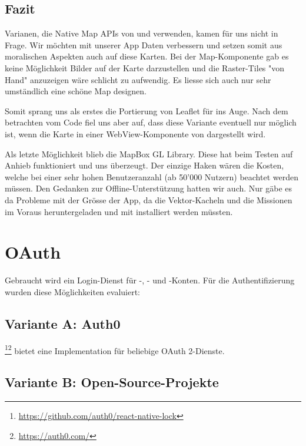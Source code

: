 \subsection{Fazit}

Varianen, die Native Map APIs von  und  verwenden, kamen für uns nicht in Frage.
Wir möchten mit unserer App  Daten verbessern und setzen somit aus moralischen Aspekten auch auf diese Karten.
Bei der  Map-Komponente gab es keine Möglichkeit Bilder auf der Karte darzustellen und die Raster-Tiles "von Hand" anzuzeigen wäre schlicht zu aufwendig. 
Es liesse sich auch nur sehr umständlich eine schöne Map designen.

Somit sprang uns als erstes die Portierung von Leaflet für  ins Auge. 
Nach dem betrachten vom Code fiel uns aber auf, dass diese Variante eventuell nur möglich ist, wenn die Karte in einer WebView-Komponente von  dargestellt wird.

Als letzte Möglichkeit blieb die MapBox GL Library.
Diese hat beim Testen auf Anhieb funktioniert und uns überzeugt.
Der einzige Haken wären die Kosten, welche bei einer sehr hohen Benutzeranzahl (ab 50'000 Nutzern) beachtet werden müssen.
Den Gedanken zur Offline-Unterstützung hatten wir auch.
Nur gäbe es da Probleme mit der Grösse der App, da die Vektor-Kacheln und die Missionen im Voraus heruntergeladen und mit installiert werden müssten.

\section{OAuth}
Gebraucht wird ein Login-Dienst für -, - und -Konten. 
Für die Authentifizierung wurden diese Möglichkeiten evaluiert:

\subsection{Variante A: Auth0}

\footnote{\url{https://github.com/auth0/react-native-lock}}\footnote{\url{https://auth0.com/}} bietet eine Implementation für beliebige OAuth 2-Dienste. 

\subsection{Variante B: Open-Source-Projekte}

